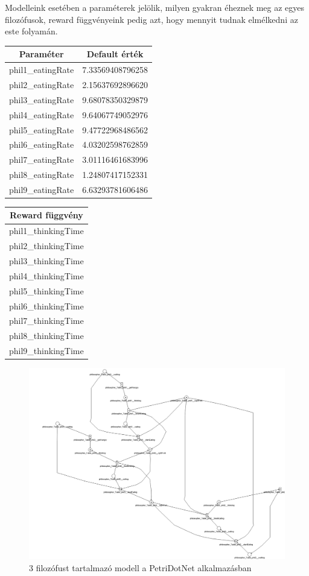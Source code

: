 Modelleink esetében a paraméterek jelölik, milyen gyakran éheznek meg az egyes filozófusok, reward függvényeink pedig azt, hogy mennyit tudnak elmélkedni az este folyamán.
\begin{center}
	\begin{tabular}{cc}
		\textbf{\textbf{Paraméter}} & \textbf{Default érték} \\
		\hline
		phil1\_eatingRate & 7.33569408796258\\
		phil2\_eatingRate & 2.15637692896620\\
		phil3\_eatingRate & 9.68078350329879\\
		phil4\_eatingRate & 9.64067749052976\\
		phil5\_eatingRate & 9.47722968486562\\
		phil6\_eatingRate & 4.03202598762859\\
		phil7\_eatingRate & 3.01116461683996\\
		phil8\_eatingRate & 1.24807417152331\\
		phil9\_eatingRate & 6.63293781606486\\
	\end{tabular}
	\label{table:filparam}
	\quad
	\begin{tabular}{c}
		\textbf{\textbf{Reward függvény}}\\
		\hline
		phil1\_thinkingTime\\
		phil2\_thinkingTime\\
		phil3\_thinkingTime\\
		phil4\_thinkingTime\\
		phil5\_thinkingTime\\
		phil6\_thinkingTime\\
		phil7\_thinkingTime\\
		phil8\_thinkingTime\\
		phil9\_thinkingTime\\
	\end{tabular}
	\label{table:filrewards}
\end{center}

\begin{figure}
	\centering
	\includegraphics[width=150mm, keepaspectratio]{figures/fil3.png}
	\caption{3 filozófust tartalmazó modell a PetriDotNet alkalmazásban}
\end{figure}